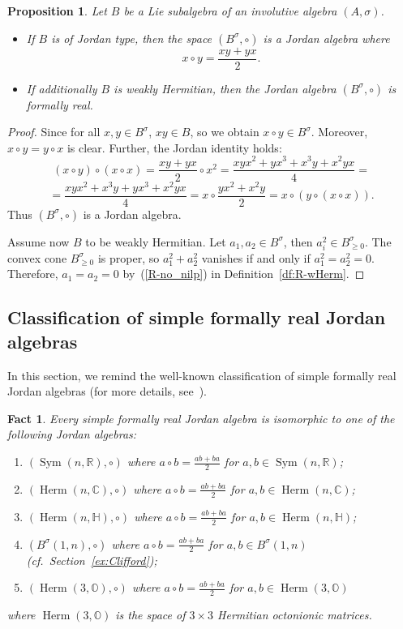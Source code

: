 \documentclass[a4paper,oneside,11pt]{amsart}
\DeclareMathOperator{\Sym}{Sym}
\DeclareMathOperator{\Herm}{Herm}
\newcommand{\R}{\mathbb R}
\newcommand{\CC}{\mathbb C}
\newcommand{\HH}{\mathbb H}
\newcommand{\Oc}{\mathbb O}
\theoremstyle{plain}
\newtheorem{prop}[teo]{Proposition}
\newtheorem{fact}[teo]{Fact}
\theoremstyle{definition}
\theoremstyle{remark}
\begin{document}
\begin{prop} Let $B$ be a Lie subalgebra of an involutive algebra $(A,\sigma)$.
\begin{itemize}
\item If $B$ is of Jordan type, then the space $(B^{\sigma},\circ)$ is a Jordan algebra where
$$x\circ y= \frac{xy+yx}{2}.$$
\item If additionally $B$ is weakly Hermitian, then the Jordan algebra $(B^{\sigma},\circ)$ is formally real.
\end{itemize}
\end{prop}

\begin{proof}
Since for all $x,y\in B^{\sigma}$, $xy\in B$, so we obtain $x\circ y\in B^{\sigma}$. Moreover, $x\circ y=y\circ x$ is clear. Further, the Jordan identity holds:
$$(x\circ y)\circ(x\circ x)=\frac{xy+yx}{2}\circ x^2=\frac{xyx^2+yx^3+x^3y+x^2yx}{4}=$$
$$=\frac{xyx^2+x^3y+yx^3+x^2yx}{4}=x\circ \frac{yx^2+x^2y}{2}=x\circ(y\circ(x\circ x)).$$
Thus $(B^{\sigma},\circ)$ is a Jordan algebra.

Assume now $B$ to be weakly Hermitian. Let $a_1, a_2\in B^{\sigma}$, then $a_i^2\in B^{\sigma}_{\geq 0}$. The convex cone $B^{\sigma}_{\geq 0}$ is proper, so $a_1^2+a_2^2$ vanishes if and only if $a_1^2=a_2^2=0$. Therefore, $a_1=a_2=0$ by~(\ref{R-no_nilp}) in Definition~\ref{df:R-wHerm}.
\end{proof}


\subsection{Classification of simple formally real Jordan algebras}

In this section, we remind the well-known classification of simple formally real Jordan algebras (for more details, see~\cite{Hanche84, Faraut}).

\begin{fact}
Every simple formally real Jordan algebra is isomorphic to one of the following Jordan algebras:
\begin{enumerate}
\item $(\Sym(n,\R),\circ)$ where $a\circ b=\frac{ab+ba}{2}$ for $a,b\in \Sym(n,\R)$;
\item $(\Herm(n,\CC),\circ)$ where $a\circ b=\frac{ab+ba}{2}$ for $a,b\in \Herm(n,\CC)$;
\item $(\Herm(n,\HH),\circ)$ where $a\circ b=\frac{ab+ba}{2}$ for $a,b\in \Herm(n,\HH)$;
\item $(B^{\sigma}(1,n),\circ)$ where $a\circ b=\frac{ab+ba}{2}$ for $a,b\in B^{\sigma}(1,n)$ (cf.~Section~\ref{ex:Clifford});
\item $(\Herm(3,\Oc),\circ)$ where $a\circ b=\frac{ab+ba}{2}$ for $a,b\in \Herm(3,\Oc)$
\end{enumerate}
where $\Herm(3,\Oc)$ is the space of $3\times 3$ Hermitian octonionic matrices.
\end{fact}
\end{document}
